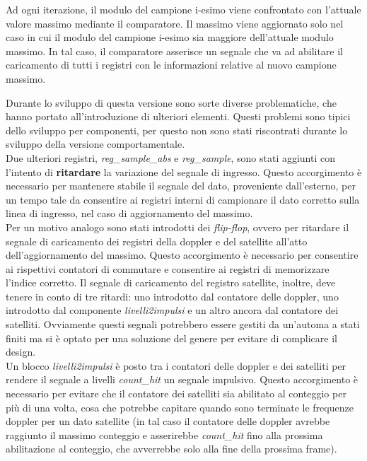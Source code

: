 \documentclass[12pt,a4paper,twoside,openany]{book}
\begin{document}
Ad ogni iterazione, il modulo del campione i-esimo viene confrontato con l'attuale valore massimo mediante il comparatore. Il massimo viene aggiornato solo nel caso in cui il modulo del campione i-esimo sia maggiore dell'attuale modulo massimo. In tal caso, il comparatore asserisce un segnale che va ad abilitare il caricamento di tutti i registri con le informazioni relative al nuovo campione massimo.

Durante lo sviluppo di questa versione sono sorte diverse problematiche, che hanno portato all'introduzione di ulteriori elementi. Questi problemi sono tipici dello sviluppo per componenti, per questo non sono stati riscontrati durante lo sviluppo della versione comportamentale. \\
Due ulteriori registri, \textit{reg\_sample\_abs} e \textit{reg\_sample}, sono stati aggiunti con l'intento di \textbf{ritardare} la variazione del segnale di ingresso. Questo accorgimento è necessario per mantenere stabile il segnale del dato, proveniente dall'esterno, per un tempo tale da consentire ai registri interni di campionare il dato corretto sulla linea di ingresso, nel caso di aggiornamento del massimo.\\
Per un motivo analogo sono stati introdotti dei \textit{flip-flop}, ovvero per ritardare il segnale di caricamento dei registri della doppler e del satellite all'atto dell'aggiornamento del massimo. Questo accorgimento è necessario per consentire ai rispettivi contatori di commutare e consentire ai registri di memorizzare l'indice corretto. Il segnale di caricamento del registro satellite, inoltre, deve tenere in conto di tre ritardi: uno introdotto dal contatore delle doppler, uno introdotto dal componente \textit{livelli2impulsi} e un altro ancora dal contatore dei satelliti. Ovviamente questi segnali potrebbero essere gestiti da un'automa a stati finiti ma si è optato per una soluzione del genere per evitare di complicare il design.\\
Un blocco \textit{livelli2impulsi} è posto tra i contatori delle doppler e dei satelliti per rendere il segnale a livelli \textit{count\_hit} un segnale impulsivo. Questo accorgimento è necessario per evitare che il contatore dei satelliti sia abilitato al conteggio per più di una volta, cosa che potrebbe capitare quando sono terminate le frequenze doppler per un dato satellite (in tal caso il contatore delle doppler avrebbe raggiunto il massimo conteggio e asserirebbe \textit{count\_hit} fino alla prossima abilitazione al conteggio, che avverrebbe solo alla fine della prossima frame).\\
\clearpage
\end{document}
